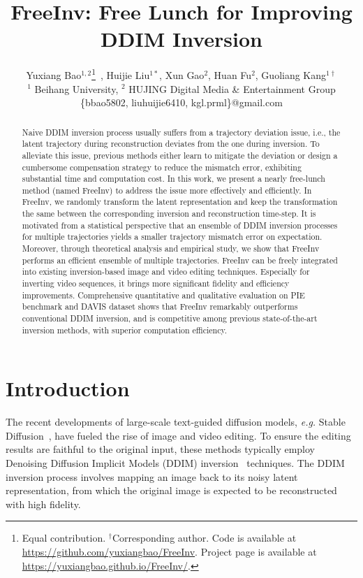 \documentclass{article}
\title{FreeInv: Free Lunch for Improving DDIM Inversion}
\author{%
 Yuxiang Bao$^{1,2}$\thanks{Equal contribution. $^\dagger$Corresponding author. Code is available at \url{https://github.com/yuxiangbao/FreeInv}. Project page is available at \url{https://yuxiangbao.github.io/FreeInv/}.}~, Huijie Liu$^{1*}$, Xun Gao$^{2}$, Huan Fu$^{2}$, Guoliang Kang$^{1 \dagger}$ \\
 $^{1}$ Beihang University, $^{2}$ HUJING Digital Media \& Entertainment Group \\ 
 \{bbao5802, liuhuijie6410, kgl.prml\}@gmail.com \\
}
\begin{document}
\maketitle

\begin{abstract}
Naive DDIM inversion process usually suffers from a trajectory deviation issue, i.e., the latent trajectory during reconstruction deviates from the one during inversion.
To alleviate this issue, previous methods either learn to mitigate the deviation or design a cumbersome compensation strategy to reduce the mismatch error, exhibiting substantial time and computation cost.
In this work, we present a nearly free-lunch method (named FreeInv) to address the issue more effectively and efficiently.
In FreeInv, we randomly transform the latent representation and keep the transformation the same between the corresponding inversion and reconstruction time-step. 
It is motivated from a statistical perspective that an ensemble of DDIM inversion processes for multiple trajectories yields a smaller trajectory mismatch error on expectation.
Moreover, through theoretical analysis and %
empirical study, we show that FreeInv performs %
an efficient ensemble of multiple trajectories.
FreeInv can be freely integrated into existing inversion-based image and video editing techniques. 
Especially for inverting video sequences, it brings more significant fidelity and efficiency improvements.
Comprehensive quantitative and qualitative evaluation on PIE benchmark and DAVIS dataset shows that FreeInv remarkably outperforms conventional DDIM inversion, and is competitive among previous state-of-the-art inversion methods, with superior computation efficiency.
\end{abstract}



\section{Introduction}
\label{sec:intro}
The recent developments of large-scale text-guided diffusion models, \emph{e.g.} Stable Diffusion~\cite{rombach2022high}, have fueled the rise of image and video editing. 
To ensure the editing results are faithful to the original input, these methods typically employ Denoising Diffusion Implicit Models (DDIM) inversion~\cite{song2021denoising} techniques.
The DDIM inversion process involves mapping an image back to its noisy latent representation, from which the original image is expected to be reconstructed with high fidelity.
\end{document}
